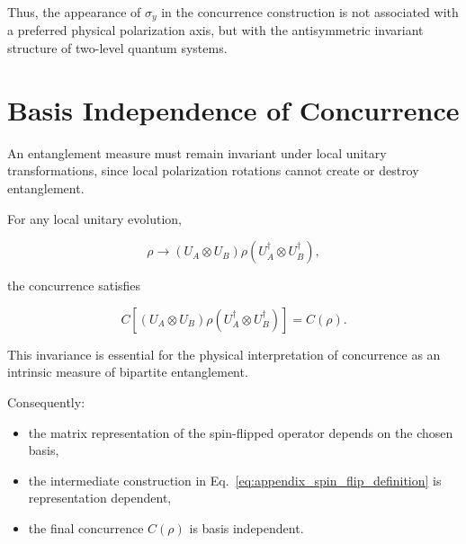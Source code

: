 Thus, the appearance of \( \sigma_y \) in the concurrence construction is not associated with a preferred physical polarization axis, but with the antisymmetric invariant structure of two-level quantum systems.


\section*{Basis Independence of Concurrence}

An entanglement measure must remain invariant under local unitary transformations, since local polarization rotations cannot create or destroy entanglement.

For any local unitary evolution,

\begin{equation}
\rho
\rightarrow
(U_A \otimes U_B)
\rho
(U_A^\dagger \otimes U_B^\dagger),
\label{eq:local_unitary_appendix}
\end{equation}

the concurrence satisfies

\begin{equation}
C
\left[
(U_A \otimes U_B)
\rho
(U_A^\dagger \otimes U_B^\dagger)
\right]
=
C(\rho).
\label{eq:concurrence_local_unitary_invariance}
\end{equation}

This invariance is essential for the physical interpretation of concurrence as an intrinsic measure of bipartite entanglement.

\medskip

Consequently:

\begin{itemize}

\item the matrix representation of the spin-flipped operator depends on the chosen basis,

\item the intermediate construction in Eq.~\eqref{eq:appendix_spin_flip_definition} is representation dependent,

\item the final concurrence \( C(\rho) \) is basis independent.

\end{itemize}


